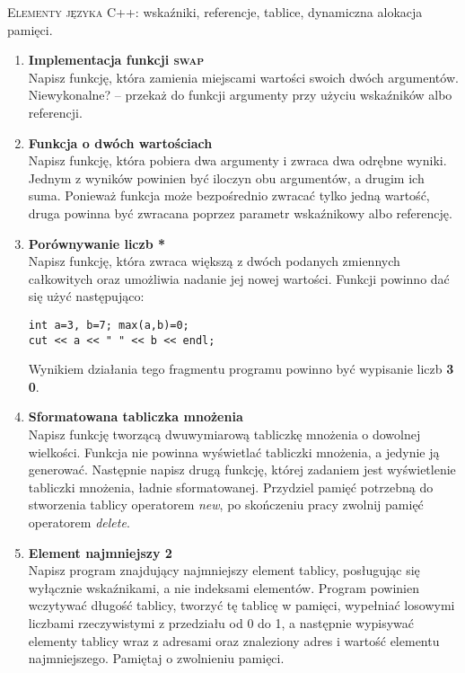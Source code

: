 \documentclass[12pt]{article}
\begin{document}
\small \textsc{Elementy języka C++:} wskaźniki, referencje, tablice, dynamiczna alokacja pamięci.

\begin{enumerate}

\item \textbf{Implementacja funkcji \textsc{swap}}\\
Napisz funkcję, która zamienia miejscami wartości swoich dwóch argumentów. Niewykonalne? -- przekaż do funkcji argumenty przy użyciu wskaźników albo referencji.

\item \textbf{Funkcja o dwóch wartościach}\\
Napisz funkcję, która pobiera dwa argumenty  i zwraca dwa odrębne wyniki. Jednym z wyników powinien być iloczyn obu argumentów, a drugim ich suma. Ponieważ funkcja może bezpośrednio zwracać tylko jedną wartość, druga powinna być zwracana poprzez parametr wskaźnikowy albo referencję.

\item \textbf{Porównywanie liczb *}\\
Napisz funkcję, która zwraca większą z dwóch podanych zmiennych całkowitych oraz umożliwia nadanie jej nowej wartości. Funkcji powinno dać się użyć następująco:
\begin{verbatim}
int a=3, b=7; max(a,b)=0;
cut << a << " " << b << endl;
\end{verbatim}
Wynikiem działania tego fragmentu programu powinno być wypisanie liczb \textbf{3 0}.

\item \textbf{Sformatowana tabliczka mnożenia}\\
Napisz funkcję tworzącą dwuwymiarową tabliczkę mnożenia o dowolnej wielkości. Funkcja nie powinna wyświetlać tabliczki mnożenia, a jedynie ją generować. Następnie napisz drugą funkcję, której zadaniem jest wyświetlenie tabliczki mnożenia, ładnie sformatowanej. Przydziel pamięć potrzebną do stworzenia tablicy operatorem \textit{new}, po skończeniu pracy zwolnij pamięć operatorem \textit{delete}.

\item \textbf{Element najmniejszy 2}\\
Napisz program znajdujący najmniejszy element tablicy, posługując się wyłącznie wskaźnikami, a nie indeksami elementów. Program powinien wczytywać długość tablicy, tworzyć tę tablicę w pamięci, wypełniać losowymi liczbami rzeczywistymi z przedziału od 0 do 1, a następnie wypisywać elementy tablicy wraz z adresami oraz znaleziony adres i wartość elementu najmniejszego. Pamiętaj o zwolnieniu pamięci.


\end{enumerate}
\end{document}
